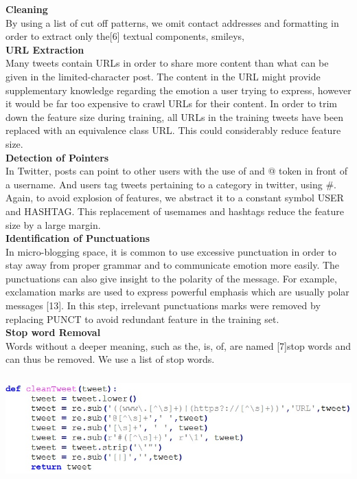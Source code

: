 \documentclass[a4paper,12pt]{report}
\begin{document}
\newline
\textbf{Cleaning}\\
\hspace*{\parindent}By using a list of cut off patterns, we omit contact addresses and formatting in order to extract only the[6] textual components, smileys,\\
\newline
\textbf{URL Extraction}\\
\hspace*{\parindent}Many tweets contain URLs in order to share more content than what can be given in the limited-character post. The content in the URL might provide supplementary knowledge regarding the emotion a user trying to express, however it would be far too expensive to crawl URLs for their content. In order to trim down the feature size during training, all URLs in the training tweets have been replaced with an equivalence class  URL. This could considerably reduce feature size.\\
\newline
\textbf{Detection of Pointers }\\
\hspace*{\parindent} In Twitter, posts can point to other users with the use of and @ token in front of a username. And users tag tweets pertaining to a category in twitter, using \#. Again, to avoid explosion of features, we abstract it to a constant symbol  USER and  HASHTAG. This replacement of usemames and hashtags reduce the feature size by a large margin.\\
\newline
\textbf{Identification of Punctuations}\\ 
\hspace*{\parindent} In micro-blogging space, it is common to use excessive punctuation in order to stay away from proper grammar and to communicate emotion more easily. The punctuations can also give insight to the polarity of the message. For example, exclamation marks are used to express powerful emphasis which are usually polar messages [13]. In this step, irrelevant punctuations marks were removed by replacing PUNCT  to avoid redundant feature in the training set.\\
\newline
\textbf{Stop word Removal  }\\ 
\hspace*{\parindent}Words without a deeper meaning, such as the, is, of, are named [7]stop words and can thus be removed. We use a list of stop words.
\begin{center}
	\includegraphics[height=4cm]{images/codepreprocessing.jpg}
\end{center}
\end{document}
